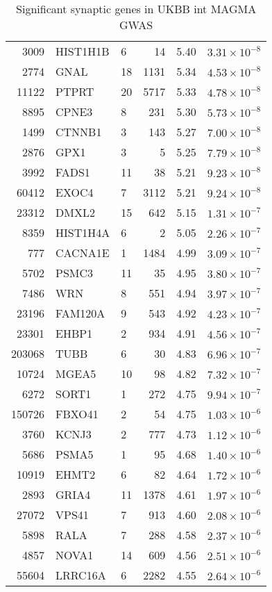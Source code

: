 \begin{table}[ht]
\begin{tabular}{rllrrr}
  3009 & HIST1H1B & 6 &  14 & 5.40 & $3.31 \times 10^{-8}$ \\ 
  2774 & GNAL & 18 & 1131 & 5.34 & $4.53 \times 10^{-8}$ \\ 
  11122 & PTPRT & 20 & 5717 & 5.33 & $4.78 \times 10^{-8}$ \\ 
  8895 & CPNE3 & 8 & 231 & 5.30 & $5.73 \times 10^{-8}$ \\ 
  1499 & CTNNB1 & 3 & 143 & 5.27 & $7.00 \times 10^{-8}$ \\ 
  2876 & GPX1 & 3 &   5 & 5.25 & $7.79 \times 10^{-8}$ \\ 
  3992 & FADS1 & 11 &  38 & 5.21 & $9.23 \times 10^{-8}$ \\ 
  60412 & EXOC4 & 7 & 3112 & 5.21 & $9.24 \times 10^{-8}$ \\ 
  23312 & DMXL2 & 15 & 642 & 5.15 & $1.31 \times 10^{-7}$ \\ 
  8359 & HIST1H4A & 6 &   2 & 5.05 & $2.26 \times 10^{-7}$ \\ 
  777 & CACNA1E & 1 & 1484 & 4.99 & $3.09 \times 10^{-7}$ \\ 
  5702 & PSMC3 & 11 &  35 & 4.95 & $3.80 \times 10^{-7}$ \\ 
  7486 & WRN & 8 & 551 & 4.94 & $3.97 \times 10^{-7}$ \\ 
  23196 & FAM120A & 9 & 543 & 4.92 & $4.23 \times 10^{-7}$ \\ 
  23301 & EHBP1 & 2 & 934 & 4.91 & $4.56 \times 10^{-7}$ \\ 
  203068 & TUBB & 6 &  30 & 4.83 & $6.96 \times 10^{-7}$ \\ 
  10724 & MGEA5 & 10 &  98 & 4.82 & $7.32 \times 10^{-7}$ \\ 
  6272 & SORT1 & 1 & 272 & 4.75 & $9.94 \times 10^{-7}$ \\ 
  150726 & FBXO41 & 2 &  54 & 4.75 & $1.03 \times 10^{-6}$ \\ 
  3760 & KCNJ3 & 2 & 777 & 4.73 & $1.12 \times 10^{-6}$ \\ 
  5686 & PSMA5 & 1 &  95 & 4.68 & $1.40 \times 10^{-6}$ \\ 
  10919 & EHMT2 & 6 &  82 & 4.64 & $1.72 \times 10^{-6}$ \\ 
  2893 & GRIA4 & 11 & 1378 & 4.61 & $1.97 \times 10^{-6}$ \\ 
  27072 & VPS41 & 7 & 913 & 4.60 & $2.08 \times 10^{-6}$ \\ 
  5898 & RALA & 7 & 288 & 4.58 & $2.37 \times 10^{-6}$ \\ 
  4857 & NOVA1 & 14 & 609 & 4.56 & $2.51 \times 10^{-6}$ \\ 
  55604 & LRRC16A & 6 & 2282 & 4.55 & $2.64 \times 10^{-6}$ \\ 
   \hline
\end{tabular}
\caption{Significant synaptic genes in UKBB int  MAGMA GWAS} 
\label{tab:Significant synaptic genes in UKBB int  MAGMA GWAS}
\end{table}

